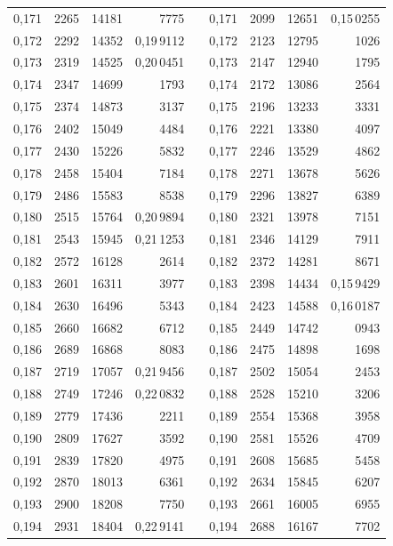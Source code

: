 \begin{tabular}{|c|c|c|r|@{}p{9pt}@{}|c|c|c|r|}
0,171 & 2265 & 14181 & 7775 &  & 0,171 & 2099 & 12651 & 0,15\,0255 \\
0,172 & 2292 & 14352 & 0,19\,9112 &  & 0,172 & 2123 & 12795 & 1026\rlap{\hspace{.35em},} \\
0,173 & 2319 & 14525 & 0,20\,0451 &  & 0,173 & 2147 & 12940 & 1795 \\
0,174 & 2347 & 14699 & 1793 &  & 0,174 & 2172 & 13086 & 2564 \\
0,175 & 2374 & 14873 & 3137 &  & 0,175 & 2196 & 13233 & 3331 \\[3pt]
0,176 & 2402 & 15049 & 4484 &  & 0,176 & 2221 & 13380 & 4097 \\
0,177 & 2430 & 15226 & 5832 &  & 0,177 & 2246 & 13529 & 4862 \\
0,178 & 2458 & 15404 & 7184 &  & 0,178 & 2271 & 13678 & 5626 \\
0,179 & 2486 & 15583 & 8538 &  & 0,179 & 2296 & 13827 & 6389 \\
0,180 & 2515 & 15764 & 0,20\,9894 &  & 0,180 & 2321 & 13978 & 7151 \\[3pt]
0,181 & 2543 & 15945 & 0,21\,1253 &  & 0,181 & 2346 & 14129 & 7911 \\
0,182 & 2572 & 16128 & 2614 &  & 0,182 & 2372 & 14281 & 8671 \\
0,183 & 2601 & 16311 & 3977 &  & 0,183 & 2398 & 14434 & 0,15\,9429 \\
0,184 & 2630 & 16496 & 5343 &  & 0,184 & 2423 & 14588 & 0,16\,0187 \\
0,185 & 2660 & 16682 & 6712 &  & 0,185 & 2449 & 14742 & 0943 \\[3pt]
0,186 & 2689 & 16868 & 8083 &  & 0,186 & 2475 & 14898 & 1698 \\
0,187 & 2719 & 17057 & 0,21\,9456 &  & 0,187 & 2502 & 15054 & 2453 \\
0,188 & 2749 & 17246 & 0,22\,0832 &  & 0,188 & 2528 & 15210 & 3206 \\
0,189 & 2779 & 17436 & 2211 &  & 0,189 & 2554 & 15368 & 3958 \\
0,190 & 2809 & 17627 & 3592 &  & 0,190 & 2581 & 15526 & 4709 \\[3pt]
0,191 & 2839 & 17820 & 4975 &  & 0,191 & 2608 & 15685 & 5458 \\
0,192 & 2870 & 18013 & 6361 &  & 0,192 & 2634 & 15845 & 6207 \\
0,193 & 2900 & 18208 & 7750 &  & 0,193 & 2661 & 16005 & 6955 \\
0,194 & 2931 & 18404 & 0,22\,9141 &  & 0,194 & 2688 & 16167 & 7702 \\

\end{tabular}
